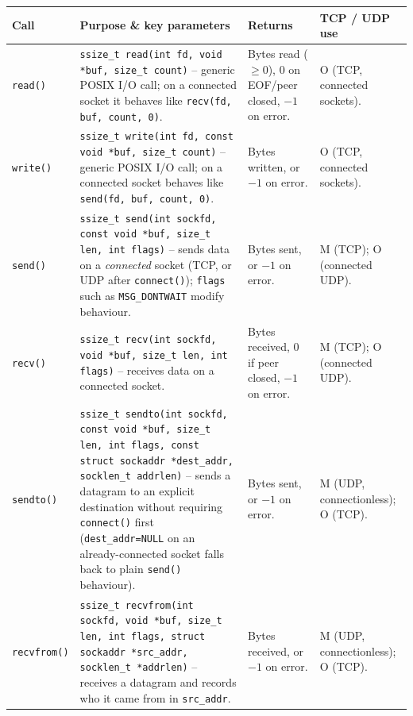 \documentclass[11pt,a4paper]{article}
\begin{document}
\begin{longtable}{|p{2.6cm}|p{6.6cm}|p{2cm}|p{3.6cm}|}
\hline
\textbf{Call} & \textbf{Purpose \& key parameters} & \textbf{Returns} & \textbf{TCP / UDP use} \\ \hline
\endhead

\texttt{read()} &
\texttt{ssize\_t read(int fd, void *buf, size\_t count)} -- generic POSIX I/O call; on a
connected socket it behaves like \texttt{recv(fd, buf, count, 0)}. &
Bytes read ($\ge 0$), $0$ on EOF/peer closed, $-1$ on error. &
O (TCP, connected sockets). \\ \hline

\texttt{write()} &
\texttt{ssize\_t write(int fd, const void *buf, size\_t count)} -- generic POSIX I/O call;
on a connected socket behaves like \texttt{send(fd, buf, count, 0)}. &
Bytes written, or $-1$ on error. &
O (TCP, connected sockets). \\ \hline

\texttt{send()} &
\texttt{ssize\_t send(int sockfd, const void *buf, size\_t len, int flags)} -- sends data on
a \emph{connected} socket (TCP, or UDP after \texttt{connect()}); \texttt{flags} such as
\texttt{MSG\_DONTWAIT} modify behaviour. &
Bytes sent, or $-1$ on error. &
M (TCP); O (connected UDP). \\ \hline

\texttt{recv()} &
\texttt{ssize\_t recv(int sockfd, void *buf, size\_t len, int flags)} -- receives data on a
connected socket. &
Bytes received, $0$ if peer closed, $-1$ on error. &
M (TCP); O (connected UDP). \\ \hline

\texttt{sendto()} &
\texttt{ssize\_t sendto(int sockfd, const void *buf, size\_t len, int flags, const struct
sockaddr *dest\_addr, socklen\_t addrlen)} -- sends a datagram to an explicit destination
without requiring \texttt{connect()} first (\texttt{dest\_addr=NULL} on an already-connected
socket falls back to plain \texttt{send()} behaviour). &
Bytes sent, or $-1$ on error. &
M (UDP, connectionless); O (TCP). \\ \hline

\texttt{recvfrom()} &
\texttt{ssize\_t recvfrom(int sockfd, void *buf, size\_t len, int flags, struct sockaddr
*src\_addr, socklen\_t *addrlen)} -- receives a datagram and records who it came from in
\texttt{src\_addr}. &
Bytes received, or $-1$ on error. &
M (UDP, connectionless); O (TCP). \\ \hline

\end{longtable}
\end{document}
